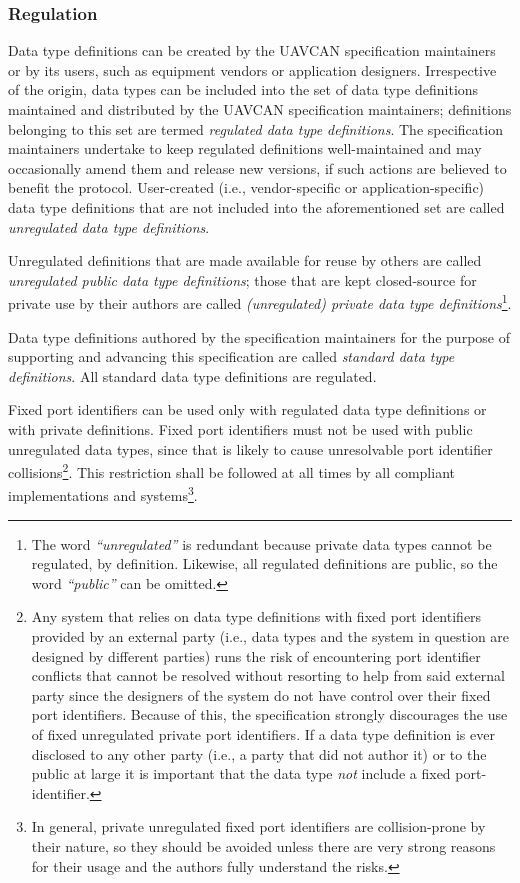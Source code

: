 \subsubsection{Regulation}

Data type definitions can be created by the UAVCAN specification maintainers or by its users,
such as equipment vendors or application designers.
Irrespective of the origin, data types can be included into the set of data type definitions maintained
and distributed by the UAVCAN specification maintainers;
definitions belonging to this set are termed \emph{regulated data type definitions}.
The specification maintainers undertake to keep regulated definitions well-maintained and may occasionally
amend them and release new versions, if such actions are believed to benefit the protocol.
User-created (i.e., vendor-specific or application-specific) data type definitions that are
not included into the aforementioned set are called \emph{unregulated data type definitions}.

Unregulated definitions that are made available for reuse by others are called
\emph{unregulated public data type definitions};
those that are kept closed-source for private use by their authors are called
\emph{(unregulated) private data type definitions}\footnote{The word \emph{``unregulated''} is redundant
because private data types cannot be regulated, by definition.
Likewise, all regulated definitions are public, so the word \emph{``public''} can be omitted.}.

Data type definitions authored by the specification maintainers for the purpose of supporting and advancing
this specification are called \emph{standard data type definitions}.
All standard data type definitions are regulated.

Fixed port identifiers can be used only with regulated data type definitions or with private definitions.
Fixed port identifiers must not be used with public unregulated data types,
since that is likely to cause unresolvable port identifier collisions\footnote{
    Any system that relies on data type definitions with fixed port identifiers provided by
    an external party (i.e., data types and the system in question are designed by different parties)
    runs the risk of encountering port identifier conflicts that cannot be resolved without resorting to help
    from said external party since the designers of the system do not have control over their fixed port identifiers.
    Because of this, the specification strongly discourages the use of fixed unregulated private port identifiers.
    If a data type definition is ever disclosed to any other party (i.e., a party that did not author it)
    or to the public at large it is important that the data type \emph{not} include a fixed port-identifier.
}.
This restriction shall be followed at all times by all compliant implementations and
systems\footnote{
    In general, private unregulated fixed port identifiers are collision-prone by their nature, so they should
    be avoided unless there are very strong reasons for their usage and the authors fully understand the risks.
}.

